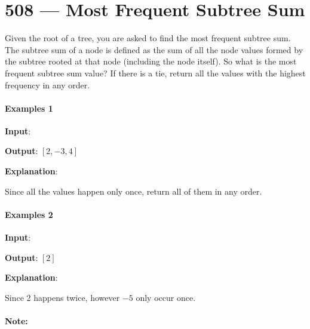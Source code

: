\section{508 --- Most Frequent Subtree Sum}
Given the root of a tree, you are asked to find the most frequent subtree sum. The subtree sum of a node is defined as the sum of all the node values formed by the subtree rooted at that node (including the node itself). So what is the most frequent subtree sum value? If there is a tie, return all the values with the highest frequency in any order.

\paragraph{Examples 1}
\begin{flushleft}
\textbf{Input}:
\begin{figure}[H]
\end{figure}
\textbf{Output}: $[2, -3, 4]$

\textbf{Explanation}:

Since all the values happen only once, return all of them in any order.
\end{flushleft}

\paragraph{Examples 2}
\begin{flushleft}
\textbf{Input}:
\begin{figure}[H]
\end{figure}

\textbf{Output}: $[2]$

\textbf{Explanation}:

Since 2 happens twice, however $-5$ only occur once.
\end{flushleft}

\paragraph{Note:} 

